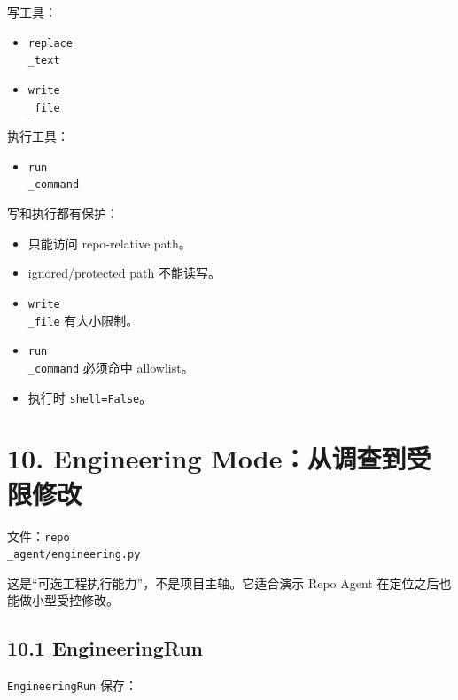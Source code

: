 \documentclass[UTF8,12pt,openany]{ctexbook}
\begin{document}
写工具：\par

\begin{itemize}
\item \texttt{replace\\_text}
\item \texttt{write\\_file}
\end{itemize}

执行工具：\par

\begin{itemize}
\item \texttt{run\\_command}
\end{itemize}

写和执行都有保护：\par

\begin{itemize}
\item 只能访问 repo-relative path。
\item ignored/protected path 不能读写。
\item \texttt{write\\_file} 有大小限制。
\item \texttt{run\\_command} 必须命中 allowlist。
\item 执行时 \texttt{shell=False}。
\end{itemize}

\section{10. Engineering Mode：从调查到受限修改}

文件：\texttt{repo\\_agent/engineering.py}\par

这是“可选工程执行能力”，不是项目主轴。它适合演示 Repo Agent 在定位之后也能做小型受控修改。\par

\subsection{10.1 EngineeringRun}

\texttt{EngineeringRun} 保存：\par
\end{document}
